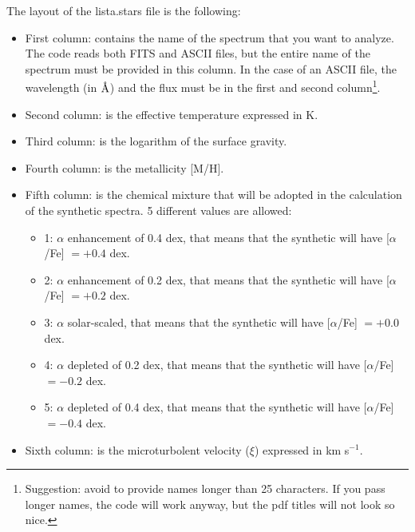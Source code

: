 \documentclass[modern]{aastex701}
\newcommand{\angstrom}{\mbox{\normalfont\AA}}
\begin{document}
The layout of the lista.stars file is the following:
\begin{itemize}
    \item First column: contains the name of the spectrum that you want to analyze. The code reads both FITS and ASCII files, but the entire name of the spectrum must be provided in this column. In the case of an ASCII file, the wavelength (in $\angstrom$) and the flux must be in the first and second column\footnote{Suggestion: avoid to provide names longer than 25 characters. If you pass longer names, the code will work anyway, but the pdf titles will not look so nice.}. 
    \item Second column: is the effective temperature expressed in K.
    \item Third column: is the logarithm of the surface gravity.
    \item Fourth column: is the metallicity [M/H].
    \item Fifth column: is the chemical mixture that will be adopted in the calculation of the synthetic spectra. 5 different values are allowed:
    \begin{itemize}
        \item 1: $\alpha$ enhancement of 0.4 dex, that means that the synthetic will have [$\alpha$/Fe] $= +0.4$ dex.
        \item 2: $\alpha$ enhancement of 0.2 dex, that means that the synthetic will have [$\alpha$/Fe] $= +0.2$ dex.
        \item 3: $\alpha$ solar-scaled, that means that the synthetic will have [$\alpha$/Fe] $= +0.0$ dex.
        \item 4: $\alpha$ depleted of 0.2 dex, that means that the synthetic will have [$\alpha$/Fe] $= -0.2$ dex.
        \item 5: $\alpha$ depleted of 0.4 dex, that means that the synthetic will have [$\alpha$/Fe] $= -0.4$ dex.
    \end{itemize}
    \item Sixth column: is the microturbolent velocity ($\xi$) expressed in km s$^{-1}$. 
    

\end{itemize}
\end{document}
